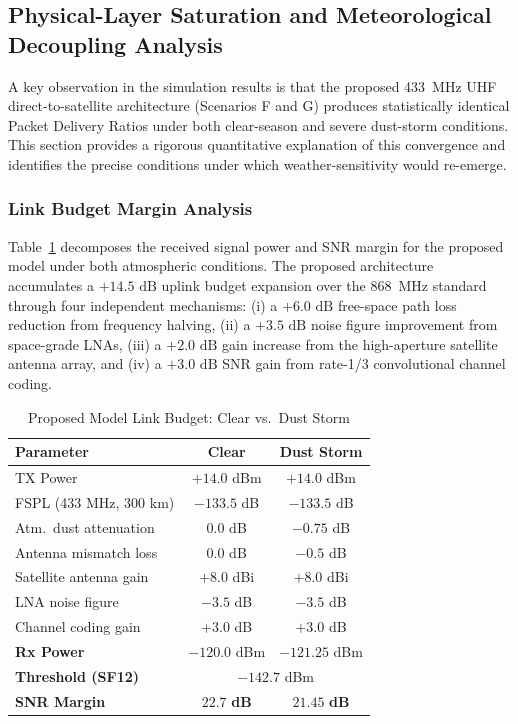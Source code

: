 \documentclass{ijuc}
\begin{document}
\subsection{Physical-Layer Saturation and Meteorological Decoupling Analysis}
\label{subsec:decoupling_analysis}

A key observation in the simulation results is that the proposed 433~MHz UHF direct-to-satellite architecture (Scenarios F and G) produces statistically identical Packet Delivery Ratios under both clear-season and severe dust-storm conditions. This section provides a rigorous quantitative explanation of this convergence and identifies the precise conditions under which weather-sensitivity would re-emerge.

\subsubsection{Link Budget Margin Analysis}
Table~\ref{tab:link_margin} decomposes the received signal power and SNR margin for the proposed model under both atmospheric conditions. The proposed architecture accumulates a $+14.5\text{ dB}$ uplink budget expansion over the 868~MHz standard through four independent mechanisms: (i) a $+6.0\text{ dB}$ free-space path loss reduction from frequency halving, (ii) a $+3.5\text{ dB}$ noise figure improvement from space-grade LNAs, (iii) a $+2.0\text{ dB}$ gain increase from the high-aperture satellite antenna array, and (iv) a $+3.0\text{ dB}$ SNR gain from rate-1/3 convolutional channel coding.

\begin{table}
\renewcommand{\arraystretch}{1.3}
\caption{Proposed Model Link Budget: Clear vs.\ Dust Storm}
\label{tab:link_margin}
\centering
\begin{tabular}{l|c|c}
\hline
\textbf{Parameter} & \textbf{Clear} & \textbf{Dust Storm} \\
\hline
TX Power                     & $+14.0$ dBm  & $+14.0$ dBm  \\
FSPL (433 MHz, 300 km)       & $-133.5$ dB  & $-133.5$ dB  \\
Atm.\ dust attenuation       & $0.0$ dB     & $-0.75$ dB   \\
Antenna mismatch loss        & $0.0$ dB     & $-0.5$ dB    \\
Satellite antenna gain       & $+8.0$ dBi   & $+8.0$ dBi   \\
LNA noise figure             & $-3.5$ dB    & $-3.5$ dB    \\
Channel coding gain          & $+3.0$ dB    & $+3.0$ dB    \\
\hline
\textbf{Rx Power}            & $-120.0$ dBm & $-121.25$ dBm \\
\textbf{Threshold (SF12)}    & \multicolumn{2}{c}{$-142.7$ dBm} \\
\textbf{SNR Margin}          & $\mathbf{22.7}$ \textbf{dB} & $\mathbf{21.45}$ \textbf{dB} \\
\hline
\end{tabular}
\end{table}
\end{document}
